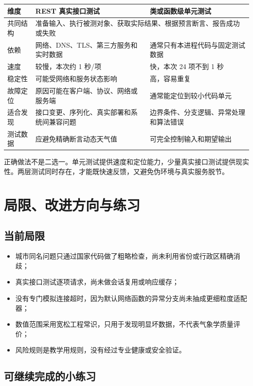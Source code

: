 \documentclass[UTF8,zihao=-4,a4paper]{ctexart}
\begin{document}
\begin{table}[htbp]
\centering
\begin{tabularx}{\textwidth}{p{}XX}
\toprule
维度 & REST 真实接口测试 & 类或函数级单元测试 \\
\midrule
共同结构 & \multicolumn{2}{p{0.70\textwidth}}{准备输入、执行被测对象、获取实际结果、根据预言断言、报告成功或失败} \\
依赖 & 网络、DNS、TLS、第三方服务和实时数据 & 通常只有本进程代码与固定测试数据 \\
速度 & 较慢，本次约 1 秒/项 & 快，本次 24 项不到 1 秒 \\
稳定性 & 可能受网络和服务状态影响 & 高，容易重复 \\
故障定位 & 原因可能在客户端、协议、网络或服务端 & 通常能定位到较小代码单元 \\
适合发现 & 接口变更、序列化、真实部署和系统间兼容问题 & 边界条件、分支逻辑、异常处理和算法错误 \\
测试数据 & 应避免精确断言动态天气值 & 可完全控制输入和期望输出 \\
\bottomrule
\end{tabularx}
\end{table}

正确做法不是二选一。单元测试提供速度和定位能力，少量真实接口测试提供现实性。两层测试同时存在，才能既快速反馈，又避免伪环境与真实服务脱节。

\section{局限、改进方向与练习}

\subsection{当前局限}

\begin{itemize}
  \item 城市同名问题只通过国家代码做了粗略检查，尚未利用省份或行政区精确消歧；
  \item 真实接口测试逐项请求，尚未做会话复用或响应缓存；
  \item 没有专门模拟连接超时，因为默认网络函数的异常分支尚未抽成更细粒度适配器；
  \item 数值范围采用宽松工程常识，只用于发现明显坏数据，不代表气象学质量评价；
  \item 风险规则是教学用规则，没有经过专业健康或安全验证。
\end{itemize}

\subsection{可继续完成的小练习}
\end{document}
